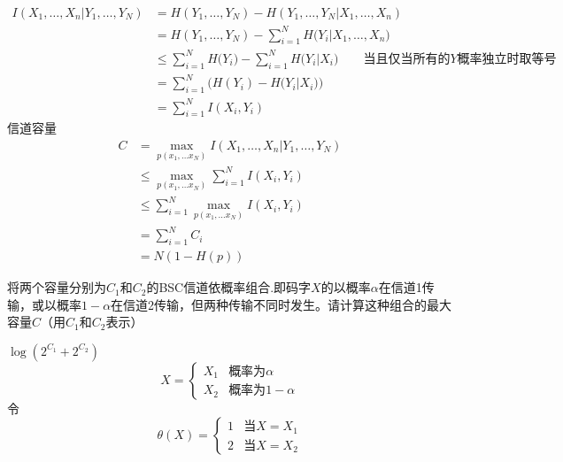 \documentclass[a4paper]{exam}
\begin{document}
\begin{CJK*}{UTF8}{gbsn}
\begin{questions}
\begin{solution}
\begin{equation*}
\begin{split}
    I({X_1}, \ldots ,{X_n}|{Y_1}, \ldots ,{Y_N}) &= H({Y_1}, \ldots ,{Y_N}) - H({Y_1}, \ldots ,{Y_N}|{X_1}, \ldots ,{X_n})\\
    & = H({Y_1}, \ldots ,{Y_N}) - \sum\limits_{i = 1}^N {H({Y_i}|} {X_1}, \ldots ,{X_n})\\
    &  \le \sum\limits_{i = 1}^N {H({Y_i}} ) - \sum\limits_{i = 1}^N {H({Y_i}|} {X_i})\qquad \text{当且仅当所有的$Y$概率独立时取等号}\\
    & = \sum\limits_{i = 1}^N {(H({Y_i}) - H({Y_i}|} {X_i}))\\
    & = \sum\limits_{i = 1}^N {I({X_i},{Y_i})} 
    \end{split}
    \end{equation*}
    信道容量
    \begin{equation*}
        \begin{split}
        C &= \mathop {\max }\limits_{p({x_1}, \ldots {x_N})} I({X_1}, \ldots ,{X_n}|{Y_1}, \ldots ,{Y_N})\\
        & \le \mathop {\max }\limits_{p({x_1}, \ldots {x_N})} \sum\limits_{i = 1}^N {I({X_i},{Y_i})} \\
        & \le \sum\limits_{i = 1}^N {\mathop {\max }\limits_{p({x_1}, \ldots {x_N})} I({X_i},{Y_i})} \\
        & = \sum\limits_{i = 1}^N {{C_i}}\\
        & = N(1 - H(p))
        \end{split}
    \end{equation*}
    \end{solution}
    \vspace{1.5cm}
    \question 将两个容量分别为$C_1$和$C_2$的BSC信道依概率组合.即码字$X$的以概率$\alpha$在信道1传输，或以概率$1-\alpha$在信道2传输，但两种传输不同时发生。请计算这种组合的最大容量$C$（用$C_1$和$C_2$表示）
    \begin{solution}
    $\log ({2^{{C_1}}} + {2^{{C_2}}})$
\begin{equation*}
    X=
   \begin{cases}
   {{X_1}} &\mbox{概率为}\alpha\\
   {{X_2}} &\mbox{概率为}1-\alpha
   \end{cases}
  \end{equation*}
  令
  \begin{equation*}
    \theta (X)=
   \begin{cases}
   1 &\mbox{当}X=X_1\\
   2 &\mbox{当}X=X_2
   \end{cases}
  \end{equation*}

\end{solution}
\end{questions}
\end{CJK*}
\end{document}
